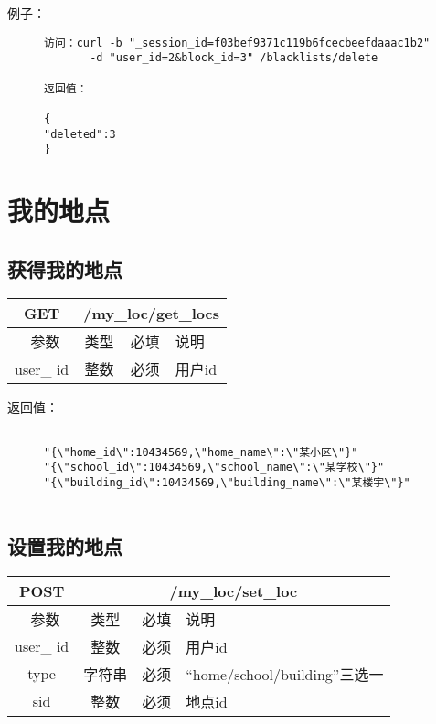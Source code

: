 例子：

\begin{figure}[H]
\begin{verbatim}
访问：curl -b "_session_id=f03bef9371c119b6fcecbeefdaaac1b2"
       -d "user_id=2&block_id=3" /blacklists/delete

返回值：

{
"deleted":3
}

\end{verbatim}
\end{figure}



\section{我的地点}


\subsection{获得我的地点}

\begin{table}[H]
   \begin{center}
\begin{tabular}{|c|c|c|p{12cm}|}
\hline
GET & \multicolumn{3}{|c|}{/my\_loc/get\_locs} \\
\hline\hline
 \  参数  & 类型 & 必填 &  说明  \\
\hline
user\_ id  & 整数 & 必须 &  用户id\\
\hline
\end{tabular}
   \end{center}
\end{table}

返回值：
\begin{figure}[H]
\begin{verbatim}

"{\"home_id\":10434569,\"home_name\":\"某小区\"}"
"{\"school_id\":10434569,\"school_name\":\"某学校\"}"
"{\"building_id\":10434569,\"building_name\":\"某楼宇\"}"


\end{verbatim}
\end{figure}



\subsection{设置我的地点}

\begin{table}[H]
   \begin{center}
\begin{tabular}{|c|c|c|p{12cm}|}
\hline
POST & \multicolumn{3}{|c|}{/my\_loc/set\_loc} \\
\hline\hline
 \  参数  & 类型 & 必填 &  说明  \\
\hline
user\_ id  & 整数 & 必须 &  用户id\\
\hline
type  & 字符串 & 必须 &  “home/school/building”三选一\\
\hline
sid  & 整数 & 必须 &  地点id\\
\hline
\end{tabular}
   \end{center}
\end{table}


